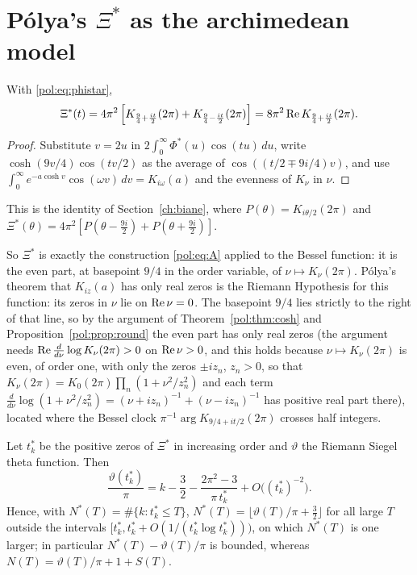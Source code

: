 \section{P\'olya's $\Xi^*$ as the archimedean model}\label{pol:sec:xistar}

\begin{proposition}\label{pol:prop:bessel}
With \eqref{pol:eq:phistar},
\begin{equation}\label{pol:eq:bessel}
\Xi^*(t)=4\pi^2\left[K_{\frac94+\frac{it}2}(2\pi)+K_{\frac94-\frac{it}2}(2\pi)\right]=8\pi^2\operatorname{Re} K_{\frac94+\frac{it}2}(2\pi).
\end{equation}
\end{proposition}

\begin{proof}
Substitute $v=2u$ in $2\int_0^\infty\Phi^*(u)\cos(tu)\,du$, write $\cosh(9v/4)\cos(tv/2)$ as the average of $\cos((t/2\mp9i/4)v)$, and use $\int_0^\infty e^{-a\cosh v}\cos(\omega v)\,dv=K_{i\omega}(a)$ and the evenness of $K_\nu$ in $\nu$.
\end{proof}

This is the identity of Section~\ref{ch:biane}, where $P(\theta)=K_{i\theta/2}(2\pi)$ and $\Xi^*(\theta)=4\pi^2[P(\theta-\frac{9i}2)+P(\theta+\frac{9i}2)]$.

So $\Xi^*$ is exactly the construction \eqref{pol:eq:A} applied to the Bessel function: it is the even part, at basepoint $9/4$ in the order variable, of $\nu\mapsto K_\nu(2\pi)$. P\'olya's theorem that $K_{iz}(a)$ has only real zeros is the Riemann Hypothesis for this function: its zeros in $\nu$ lie on $\operatorname{Re}\nu=0$. The basepoint $9/4$ lies strictly to the right of that line, so by the argument of Theorem~\ref{pol:thm:cosh} and Proposition~\ref{pol:prop:round} the even part has only real zeros (the argument needs $\operatorname{Re}\frac d{d\nu}\log K_\nu(2\pi)>0$ on $\operatorname{Re}\nu>0$, and this holds because $\nu\mapsto K_\nu(2\pi)$ is even, of order one, with only the zeros $\pm iz_n$, $z_n>0$, so that $K_\nu(2\pi)=K_0(2\pi)\prod_n(1+\nu^2/z_n^2)$ and each term $\frac{d}{d\nu}\log(1+\nu^2/z_n^2)=(\nu+iz_n)^{-1}+(\nu-iz_n)^{-1}$ has positive real part there), located where the Bessel clock $\pi^{-1}\arg K_{9/4+it/2}(2\pi)$ crosses half integers.

\begin{proposition}\label{pol:prop:gram}
Let $t_k^*$ be the positive zeros of $\Xi^*$ in increasing order and $\vartheta$ the Riemann Siegel theta function. Then\begin{equation}\label{pol:eq:gram}\frac{\vartheta(t_k^*)}{\pi}=k-\frac32-\frac{2\pi^2-3}{\pi\,t_k^*}+O\big((t_k^*)^{-2}\big).\end{equation} Hence, with $N^*(T)=\#\{k:t_k^*\le T\}$, $N^*(T)=\lfloor\vartheta(T)/\pi+\frac32\rfloor$ for all large $T$ outside the intervals $[t_k^*,t_k^*+O(1/(t_k^*\log t_k^*)))$, on which $N^*(T)$ is one larger; in particular $N^*(T)-\vartheta(T)/\pi$ is bounded, whereas $N(T)=\vartheta(T)/\pi+1+S(T)$.
\end{proposition}

